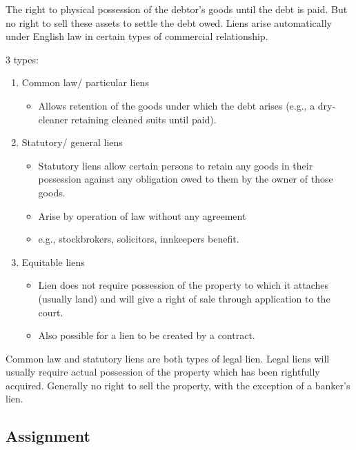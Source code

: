 \documentclass[
]{article}
\providecommand{\tightlist}{%
  \setlength{\itemsep}{0pt}\setlength{\parskip}{0pt}}
\begin{document}
The right to physical possession of the debtor's goods until the debt is
paid. But no right to sell these assets to settle the debt owed. Liens
arise automatically under English law in certain types of commercial
relationship.

3 types:

\begin{enumerate}
\def\labelenumi{\arabic{enumi}.}
\tightlist
\item
  Common law/ particular liens

  \begin{itemize}
  \tightlist
  \item
    Allows retention of the goods under which the debt arises (e.g., a
    dry-cleaner retaining cleaned suits until paid).
  \end{itemize}
\item
  Statutory/ general liens

  \begin{itemize}
  \tightlist
  \item
    Statutory liens allow certain persons to retain any goods in their
    possession against any obligation owed to them by the owner of those
    goods.
  \item
    Arise by operation of law without any agreement
  \item
    e.g., stockbrokers, solicitors, innkeepers benefit.
  \end{itemize}
\item
  Equitable liens

  \begin{itemize}
  \tightlist
  \item
    Lien does not require possession of the property to which it
    attaches (usually land) and will give a right of sale through
    application to the court.
  \item
    Also possible for a lien to be created by a contract.
  \end{itemize}
\end{enumerate}

Common law and statutory liens are both types of legal lien. Legal liens
will usually require actual possession of the property which has been
rightfully acquired. Generally no right to sell the property, with the
exception of a banker's lien.

\hypertarget{assignment}{%
\subsection{Assignment}\label{assignment}}
\end{document}
